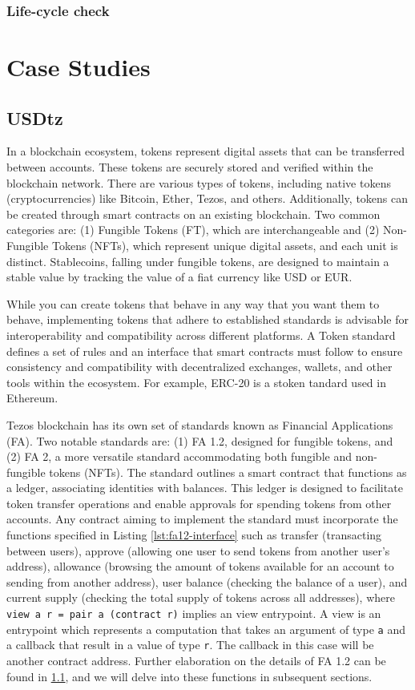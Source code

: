 \documentclass[a4paper,UKenglish,cleveref, autoref, thm-restate]{lipics-v2021}
\begin{document}
\subsubsection{Life-cycle check}
\section {Case Studies}
\subsection{USDtz}
In a blockchain ecosystem, tokens represent digital assets that can be transferred between accounts. These tokens are securely stored and verified within the blockchain network. There are various types of tokens, including native tokens (cryptocurrencies) like Bitcoin, Ether, Tezos, and others. Additionally, tokens can be created through smart contracts on an existing blockchain. Two common categories are: (1) Fungible Tokens (FT), which are interchangeable and (2) Non-Fungible Tokens (NFTs), which represent unique digital assets, and each unit is distinct. Stablecoins, falling under fungible tokens, are designed to maintain a stable value by tracking the value of a fiat currency like USD or EUR.

While you can create tokens that behave in any way that you want them to behave, implementing tokens that adhere to established standards is advisable for interoperability and compatibility across different platforms. A Token standard defines a set of rules and an interface that smart contracts must follow to ensure consistency and compatibility with decentralized exchanges, wallets, and other tools within the ecosystem. For example, ERC-20 is a stoken tandard used in Ethereum. 

Tezos blockchain has its own set of standards known as Financial Applications (FA). Two notable standards are: (1) FA 1.2, designed for fungible tokens, and (2) FA 2, a more versatile standard accommodating both fungible and non-fungible tokens (NFTs).  The standard outlines a smart contract that functions as a ledger, associating identities with balances. This ledger is designed to facilitate token transfer operations and enable approvals for spending tokens from other accounts. Any contract aiming to implement the standard must incorporate the functions specified in Listing \ref{lst:fa12-interface} such as transfer (transacting between users), approve (allowing one user to send tokens from another user's address), allowance (browsing the amount of tokens available for an account to sending from another address), user balance (checking the balance of a user), and current supply (checking the total supply of tokens across all addresses), where \lstinline/view a r = pair a (contract r)/ implies an view entrypoint.  A view is an entrypoint which represents a computation that takes an argument of type \lstinline/a/ and a callback that result in a value of type \lstinline/r/. The callback in this case will be another contract address. Further elaboration on the details of FA 1.2 can be found in \ref{}, and we will delve into these functions in subsequent sections.
\end{document}
